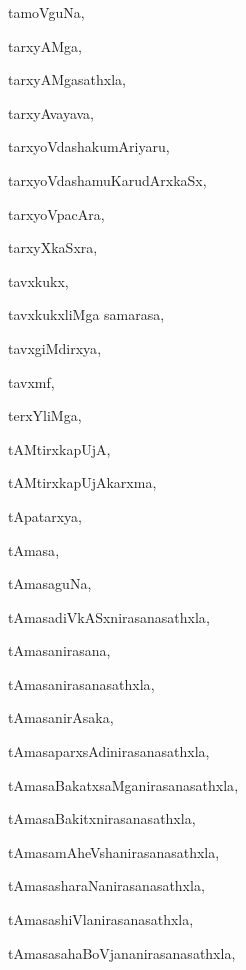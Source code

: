 \begin{multicols}{2}
{tamoVguNa}, \pageref{tamoVguNa}

{tarxyAMga}, \pageref{tarxyAMga}

{tarxyAMgasathxla}, \pageref{tarxyAMgasathxla}

{tarxyAvayava}, \pageref{tarxyAvayava}

{tarxyoVdashakumAriyaru}, \pageref{tarxyoVdashakumAriyaru}

{tarxyoVdashamuKarudArxkaSx}, \pageref{tarxyoVdashamuKarudArxkaSx}

{tarxyoVpacAra}, \pageref{tarxyoVpacAra}

{tarxyXkaSxra}, \pageref{tarxyXkaSxra}

{tavxkukx}, \pageref{tavxkukx}

{tavxkukxliMga samarasa}, \pageref{tavxkukxliMga samarasa}

{tavxgiMdirxya}, \pageref{tavxgiMdirxya}

{tavxmf}, \pageref{tavxmf}

{terxYliMga}, \pageref{terxYliMga1}

{tAMtirxkapUjA}, \pageref{tAMtirxkapUjA}

{tAMtirxkapUjAkarxma}, \pageref{tAMtirxkapUjAkarxma}

{tApatarxya}, \pageref{tApatarxya}

{tAmasa}, \pageref{tAmasa}

{tAmasaguNa}, \pageref{tAmasaguNa}

{tAmasadiVkASxnirasanasathxla}, \pageref{tAmasadiVkASxnirasanasathxla}

{tAmasanirasana}, \pageref{tAmasanirasana}

{tAmasanirasanasathxla}, \pageref{tAmasanirasanasathxla}

{tAmasanirAsaka}, \pageref{tAmasanirAsaka}

{tAmasaparxsAdinirasanasathxla}, \pageref{tAmasaparxsAdinirasanasathxla}

{tAmasaBakatxsaMganirasanasathxla}, \pageref{tAmasaBakatxsaMganirasanasathxla}

{tAmasaBakitxnirasanasathxla}, \pageref{tAmasaBakitxnirasanasathxla}

{tAmasamAheVshanirasanasathxla}, \pageref{tAmasamAheVshanirasanasathxla}

{tAmasasharaNanirasanasathxla}, \pageref{tAmasasharaNanirasanasathxla}

{tAmasashiVlanirasanasathxla}, \pageref{tAmasashiVlanirasanasathxla}

{tAmasasahaBoVjananirasanasathxla}, \pageref{tAmasasahaBoVjananirasanasathxla}


\end{multicols}
